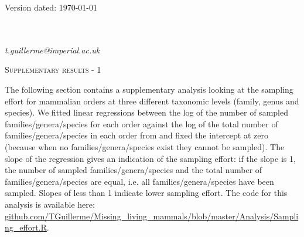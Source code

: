 \documentclass[12pt,letterpaper]{article}
\renewcommand{\section}[1]{%
\bigskip
\begin{center}
\begin{Large}
\normalfont\scshape #1
\medskip
\end{Large}
\end{center}}
\begin{document}
\newcommand{\beginsupplement}{%
    \setcounter{table}{0}
    \renewcommand{\thetable}{S\arabic{table}}%
    \setcounter{figure}{0}
    \renewcommand{\thefigure}{S\arabic{figure}}%
}

\begin{flushright}
Version dated: \today
\end{flushright}

\bigskip
\medskip
\begin{center}


\bigskip
{}

\bigskip
{}\\
\\
\medskip
{} \textit{t.guillerme@imperial.ac.uk}\\  
\vspace{1in}

\end{center}

\newpage

\section{Supplementary results - 1}
The following section contains a supplementary analysis looking at the sampling effort for mammalian orders at three different taxonomic levels (family, genus and species).
We fitted linear regressions between the log of the number of sampled families/genera/species for each order against the log of the total number of families/genera/species in each order from \cite{bininda-emondsthe2007} and fixed the intercept at zero (because when no families/genera/species exist they cannot be sampled).
The slope of the regression gives an indication of the sampling effort: if the slope is 1, the number of sampled families/genera/species and the total number of families/genera/species are equal, i.e. all families/genera/species have been sampled. 
Slopes of less than 1 indicate lower sampling effort.
The code for this analysis is available here: \url{github.com/TGuillerme/Missing_living_mammals/blob/master/Analysis/Sampling_effort.R}.
\end{document}
